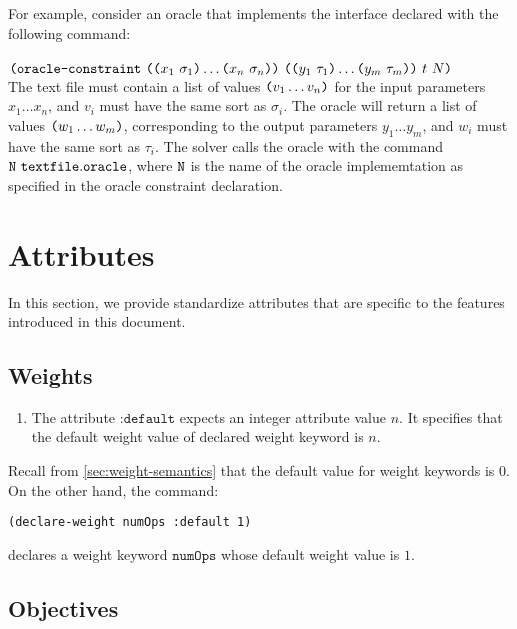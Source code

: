 \documentclass[english,a4paper,10pt]{article}
\begin{document}
For example, consider an oracle that implements the interface declared with the following command:\\\\
$\texttt{(}\texttt{oracle-constraint}\mbox{ } 
\texttt{(}\texttt{(}x_1\mbox{ }\sigma_1\texttt{)} \ldots \texttt{(}x_n\mbox{ }\sigma_n\texttt{)}\texttt{)}\mbox{ }
\texttt{(}\texttt{(}y_{1}\mbox{ }\tau_{1}\texttt{)} \ldots \texttt{(}y_{m}\mbox{ }\tau_{m}\texttt{)}\texttt{)}  \mbox{ } t\mbox{ } N \texttt{)}$ \\

The text file must contain a list of values $\texttt{(}v_1 \ldots v_n\texttt{)}$ for the input parameters $x_1 \ldots x_n$, and $v_i$ must have the same sort as $\sigma_i$.
The oracle will return a list of values $\texttt{(}w_{1} \ldots w_{m}\texttt{)}$, corresponding to the output parameters $y_{1} \ldots y_{m}$, and $w_i$ must have the same sort as $\tau_i$.
%
The solver calls the oracle with the command ${\tt N \,\,textfile.oracle}$, where ${\tt N}$ is the name of the oracle implememtation as specified in the oracle constraint declaration.

\section{Attributes}
\label{sec:attr}

In this section, we provide standardize attributes that are specific to
the features introduced in this document.

\subsection{Weights}%
\label{sec:attr-weights}

\begin{enumerate}
\item The attribute $\texttt{:default}$
expects an integer attribute value $n$.
It specifies that the default weight value of declared weight keyword is $n$.
\end{enumerate}
\noindent
Recall from \cref{sec:weight-semantics} that the default value
for weight keywords is $0$.
On the other hand, the command:
\begin{lstlisting}[language=SyGuS, numbers=none, basicstyle=\ttfamily\small]
(declare-weight numOps :default 1)
\end{lstlisting}
declares a weight keyword $\texttt{numOps}$ whose default weight value is $1$.

\subsection{Objectives}%
\label{sec:attr-objectives}
\end{document}
